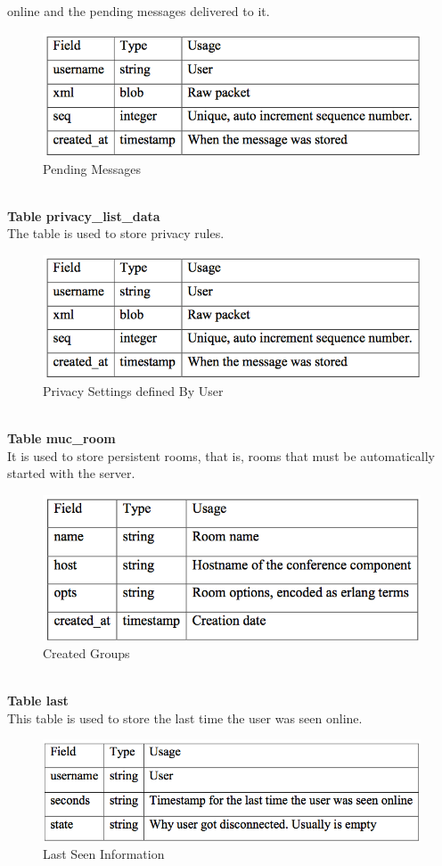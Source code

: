 online and the pending messages delivered to it.\\
\begin{figure}[ht]
\centering
\includegraphics[scale=0.5]{input/images/t3.png}
\caption{Pending Messages}
\end{figure}\\
\textbf{Table privacy\_list\_data}\\
\noindent The table is used to store privacy rules.
\begin{figure}[ht]
\centering
\includegraphics[scale=0.5]{input/images/t3.png}
\caption{Privacy Settings defined By User}
\end{figure}\\
\noindent \textbf{Table muc\_room}\\
\noindent It is used to store persistent rooms, that is, rooms that must be automatically started with the server.\\
\begin{figure}[ht]
\centering
\includegraphics[scale=0.5]{input/images/t5.png}
\caption{Created Groups}
\end{figure}\\
\noindent \textbf{Table last}\\
\noindent This table is used to store the last time the user was seen online.\\
\begin{figure}[ht]
\centering
\includegraphics[scale=0.5]{input/images/t6.png}
\caption{Last Seen Information}
\end{figure}
